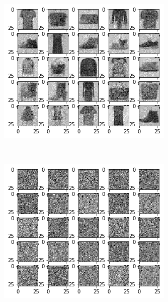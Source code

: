 \begin{figure}[htbp!]
\begin{subfigure}[b]{0.3\textwidth}
         \label{fig:nice_results_mnist}
     \end{subfigure}
     \hfill
     \begin{subfigure}[b]{0.3\textwidth}
         \centering
         \includegraphics[width=\textwidth]{Images/fashion1.png}
         \label{fig:nice_results_fashion}
     \end{subfigure}
     \\
     \begin{subfigure}[b]{0.3\textwidth}
         \centering
         \includegraphics[width=\textwidth]{Images/prior2.png}

\end{subfigure}
\end{figure}
